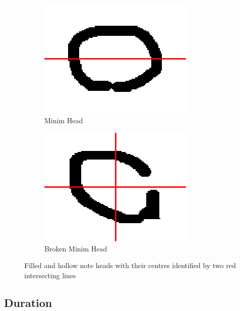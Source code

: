 \begin{figure}[H]
    \begin{subfigure}[b]{.3\linewidth}
        \centering
        \includegraphics[width=\linewidth]{gfx/techniques/scoring/note-head/1818-centroid-centre.png}
        \caption{Minim Head}
    \end{subfigure}
    \begin{subfigure}[b]{.3\linewidth}
        \centering
        \includegraphics[width=\linewidth]{gfx/techniques/scoring/note-head/6105-centroid-centre.png}
        \caption{Broken Minim Head}
    \end{subfigure}

  \caption{Filled and hollow note heads with their centres identified by two red intersecting lines}
  \label{fig:ccl-two-pass}
\end{figure}

\subsection{Duration}
\label{sec:duration-identification}

